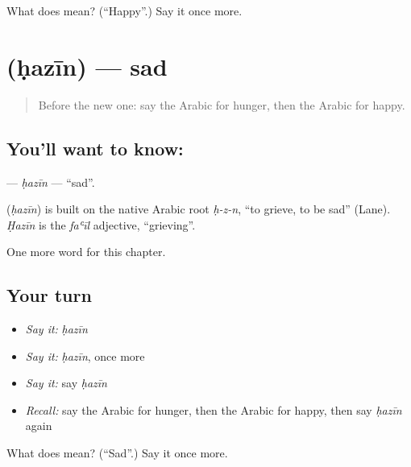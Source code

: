 \begin{tcolorbox}[breakable,colback=teal!4,colframe=teal!35!black,title={Before you move on}]
What does  mean? (\textquotedblleft{}Happy\textquotedblright{}.) Say it once more.
\end{tcolorbox}
\section[\texorpdfstring{\ar{حزين} (ḥazīn)}{حزين (ḥazīn)}]{ (ḥazīn) — sad}

\label{lesson:AR-C54-hazin}



\begin{quote}
Before the new one: say the Arabic for hunger, then the Arabic for happy.
\end{quote}

\subsection*{You'll want to know: }
\textbf{} — \emph{ḥazīn} — \textquotedblleft{}sad\textquotedblright{}.

\begin{cousinweb}
\textbf{} (\emph{ḥazīn}) is built on the native Arabic root \emph{ḥ-z-n}, \textquotedblleft{}to grieve, to be sad\textquotedblright{} (Lane). \emph{Ḥazīn} is the \emph{faʿīl} adjective, \textquotedblleft{}grieving\textquotedblright{}.
\end{cousinweb}

\begin{grammarlens}[title={What you've built}]
One more word for this chapter.
\end{grammarlens}

\subsection*{Your turn}
\begin{itemize}
\raggedright
  \item \emph{Say it:} \emph{ḥazīn}
  \item \emph{Say it:} \emph{ḥazīn}, once more
  \item \emph{Say it:} say \emph{ḥazīn}
  \item \emph{Recall:} say the Arabic for hunger, then the Arabic for happy, then say \emph{ḥazīn} again
\end{itemize}

\begin{tcolorbox}[breakable,colback=teal!4,colframe=teal!35!black,title={Before you move on}]
What does  mean? (\textquotedblleft{}Sad\textquotedblright{}.) Say it once more.
\end{tcolorbox}
